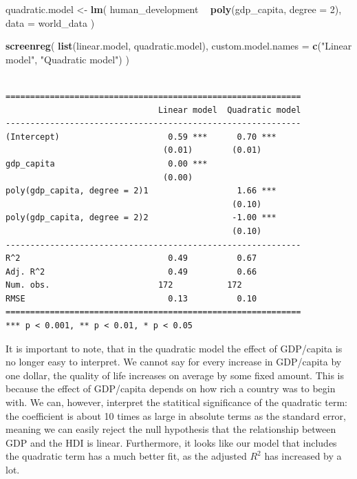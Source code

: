 \documentclass[]{article}
\newenvironment{Shaded}{\begin{snugshade}}{\end{snugshade}}
\newcommand{\DataTypeTok}[1]{\textcolor[rgb]{0.13,0.29,0.53}{#1}}
\newcommand{\DecValTok}[1]{\textcolor[rgb]{0.00,0.00,0.81}{#1}}
\newcommand{\KeywordTok}[1]{\textcolor[rgb]{0.13,0.29,0.53}{\textbf{#1}}}
\newcommand{\NormalTok}[1]{#1}
\newcommand{\OperatorTok}[1]{\textcolor[rgb]{0.81,0.36,0.00}{\textbf{#1}}}
\newcommand{\StringTok}[1]{\textcolor[rgb]{0.31,0.60,0.02}{#1}}
\begin{document}
\begin{Shaded}
\begin{Highlighting}[]
\NormalTok{quadratic.model <-}\StringTok{ }\KeywordTok{lm}\NormalTok{(}
\NormalTok{  human_development }\OperatorTok{~}\StringTok{ }\KeywordTok{poly}\NormalTok{(gdp_capita, }\DataTypeTok{degree =} \DecValTok{2}\NormalTok{), }
  \DataTypeTok{data =}\NormalTok{ world_data}
\NormalTok{)}


\KeywordTok{screenreg}\NormalTok{(}
  \KeywordTok{list}\NormalTok{(linear.model, quadratic.model), }
  \DataTypeTok{custom.model.names =} \KeywordTok{c}\NormalTok{(}\StringTok{"Linear model"}\NormalTok{, }\StringTok{"Quadratic model"}\NormalTok{)}
\NormalTok{)}
\end{Highlighting}
\end{Shaded}

\begin{verbatim}

============================================================
                               Linear model  Quadratic model
------------------------------------------------------------
(Intercept)                      0.59 ***      0.70 ***     
                                (0.01)        (0.01)        
gdp_capita                       0.00 ***                   
                                (0.00)                      
poly(gdp_capita, degree = 2)1                  1.66 ***     
                                              (0.10)        
poly(gdp_capita, degree = 2)2                 -1.00 ***     
                                              (0.10)        
------------------------------------------------------------
R^2                              0.49          0.67         
Adj. R^2                         0.49          0.66         
Num. obs.                      172           172            
RMSE                             0.13          0.10         
============================================================
*** p < 0.001, ** p < 0.01, * p < 0.05
\end{verbatim}

It is important to note, that in the quadratic model the effect of GDP/capita is no longer easy to interpret. We cannot say for every increase in GDP/capita by one dollar, the quality of life increases on average by some fixed amount. This is because the effect of GDP/capita depends on how rich a country was to begin with. We can, however, interpret the statitical significance of the quadratic term: the coefficient is about 10 times as large in absolute terms as the standard error, meaning we can easily reject the null hypothesis that the relationship between GDP and the HDI is linear. Furthermore, it looks like our model that includes the quadratic term has a much better fit, as the adjusted \(R^2\) has increased by a lot.
\end{document}
